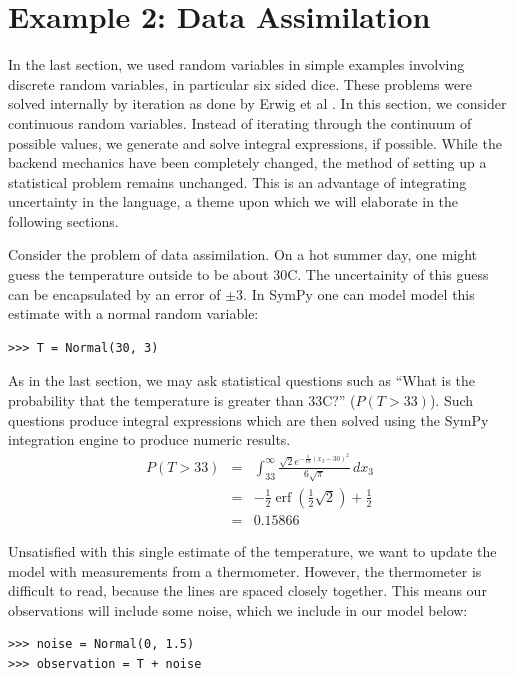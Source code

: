 \section{Example 2: Data Assimilation}

In the last section, we used random variables in simple examples involving
discrete random variables, in particular six sided dice. These problems were
solved internally by iteration as done by Erwig et al \cite{Erwig2006}. In this
section, we consider continuous random variables. Instead of iterating through
the continuum of possible values, we generate and solve integral expressions,
if possible. While the backend mechanics have been completely changed, the
method of setting up a statistical problem remains unchanged. This is an
advantage of integrating uncertainty in the language, a theme upon which we
will elaborate in the following sections.

Consider the problem of data assimilation. On a hot summer day, one might guess
the temperature outside to be about 30C. The uncertainity of this guess can be
encapsulated by an error of $\pm3$. In SymPy one can model model this estimate
with a normal random variable:

\begin{lstlisting}
>>> T = Normal(30, 3)
\end{lstlisting}

As in the last section, we may ask statistical questions such as ``What is the
probability that the temperature is greater than 33C?'' ($P(T>33)$). Such
questions produce integral expressions which are then solved using the SymPy
integration engine to produce numeric results.
\begin{eqnarray*}
P(T>33) & = & \int_{33}^{\infty} \frac{\sqrt{2} e^{- \frac{1}{18} \left(x_{3} -30\right)^{2}}}{6 \sqrt{\pi}}\, dx_{3} \\
& = & - \frac{1}{2} \operatorname{erf}{\left (\frac{1}{2} \sqrt{2} \right )} + \frac{1}{2} \\
& = & 0.15866
\end{eqnarray*}

Unsatisfied with this single estimate of the temperature, we want to update the
model with measurements from a thermometer. However, the thermometer is
difficult to read, because the lines are spaced closely together.  This means
our observations will include some noise, which we include in our model below:

\begin{lstlisting}
>>> noise = Normal(0, 1.5)
>>> observation = T + noise
\end{lstlisting}

